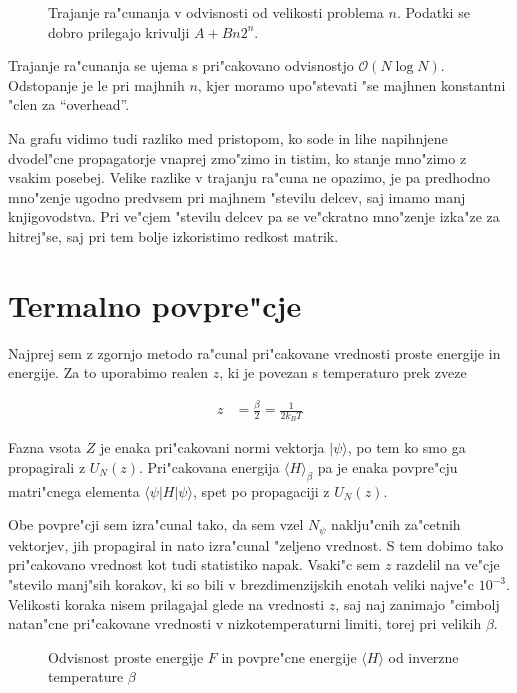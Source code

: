 \documentclass[a4paper,10pt]{article}
\begin{document}
\begin{figure}[h]
\centering

 \caption{Trajanje ra"cunanja v odvisnosti od velikosti problema $n$. Podatki se dobro prilegajo krivulji $A + B n 2^n$. }
\end{figure}

Trajanje ra"cunanja se ujema s pri"cakovano odvisnostjo $\mathcal{O}(N \log N)$. 
Odstopanje je le pri majhnih $n$, kjer moramo upo"stevati "se majhnen konstantni "clen za ``overhead''.

Na grafu vidimo tudi razliko med pristopom, ko sode in lihe napihnjene dvodel"cne propagatorje vnaprej zmo"zimo in tistim, ko stanje mno"zimo z vsakim posebej. 
Velike razlike v trajanju ra"cuna ne opazimo, je pa predhodno mno"zenje ugodno predvsem pri majhnem "stevilu delcev, saj imamo manj knjigovodstva. 
Pri ve"cjem "stevilu delcev pa se ve"ckratno mno"zenje izka"ze za hitrej"se, saj pri tem bolje izkoristimo redkost matrik. 

\section{Termalno povpre"cje}

Najprej sem z zgornjo metodo ra"cunal pri"cakovane vrednosti proste energije in energije. 
Za to uporabimo realen $z$, ki je povezan s temperaturo prek zveze

\begin{align}
 z &= \frac{\beta}{2} = \frac{1}{2k_B T}
\end{align}

Fazna vsota $Z$ je enaka pri"cakovani normi vektorja $|\psi\rangle$, po tem ko smo ga propagirali z $U_N(z)$. Pri"cakovana energija $\langle H \rangle_\beta$ pa je enaka povpre"cju matri"cnega elementa $\langle \psi | H | \psi\rangle$, spet po propagaciji z $U_N(z)$. 

Obe povpre"cji sem izra"cunal tako, da sem vzel $N_\psi$ naklju"cnih za"cetnih vektorjev, jih propagiral in nato izra"cunal "zeljeno vrednost. 
S tem dobimo tako pri"cakovano vrednost kot tudi statistiko napak. 
Vsaki"c sem $z$ razdelil na ve"cje "stevilo manj"sih korakov, ki so bili v brezdimenzijskih enotah veliki najve"c $10^{-3}$. 
Velikosti koraka nisem prilagajal glede na vrednosti $z$, saj naj zanimajo "cimbolj natan"cne pri"cakovane vrednosti v nizkotemperaturni limiti, torej pri velikih $\beta$. 

\begin{figure}[H]
 \centering
 
 \caption{Odvisnost proste energije $F$ in povpre"cne energije $\langle H\rangle$ od inverzne temperature $\beta$}
\end{figure}
\end{document}

